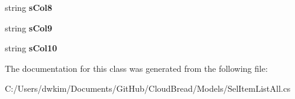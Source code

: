 \begin{DoxyCompactItemize}
\item 
string {\bfseries s\+Col8}\hypertarget{a00093_a3491fefa0103ab19fa4474aee9974b3c}{}\label{a00093_a3491fefa0103ab19fa4474aee9974b3c}

\item 
string {\bfseries s\+Col9}\hypertarget{a00093_a5479281dab4d64c932ef28fc62a9d53f}{}\label{a00093_a5479281dab4d64c932ef28fc62a9d53f}

\item 
string {\bfseries s\+Col10}\hypertarget{a00093_a1e85d83fcdc0ca357f6e90dfce758df9}{}\label{a00093_a1e85d83fcdc0ca357f6e90dfce758df9}

\end{DoxyCompactItemize}


The documentation for this class was generated from the following file\+:\begin{DoxyCompactItemize}
\item 
C\+:/\+Users/dwkim/\+Documents/\+Git\+Hub/\+Cloud\+Bread/\+Models/Sel\+Item\+List\+All.\+cs\end{DoxyCompactItemize}
